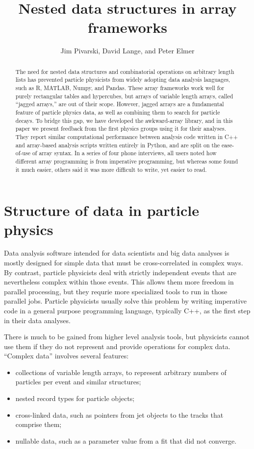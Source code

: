 \documentclass[a4paper]{jpconf}
\begin{document}
\title{Nested data structures in array frameworks}

\author{Jim Pivarski, David Lange, and Peter Elmer}

\address{Princeton University}


\begin{abstract}
The need for nested data structures and combinatorial operations on arbitrary length lists has prevented particle physicists from widely adopting data analysis languages, such as R, MATLAB, Numpy, and Pandas. These array frameworks work well for purely rectangular tables and hypercubes, but arrays of variable length arrays, called ``jagged arrays,'' are out of their scope. However, jagged arrays are a fundamental feature of particle physics data, as well as combining them to search for particle decays. To bridge this gap, we have developed the awkward-array library, and in this paper we present feedback from the first physics groups using it for their analyses. They report similar computational performance between analysis code written in C++ and array-based analysis scripts written entirely in Python, and are split on the ease-of-use of array syntax. In a series of four phone interviews, all users noted how different array programming is from imperative programming, but whereas some found it much easier, others said it was more difficult to write, yet easier to read.
\end{abstract}

\section{Structure of data in particle physics}

Data analysis software intended for data scientists and big data analyses is mostly designed for simple data that must be cross-correlated in complex ways. By contrast, particle physicists deal with strictly independent events that are nevertheless complex within those events. This allows them more freedom in parallel processing, but they requrie more specialized tools to run in those parallel jobs. Particle physicists usually solve this problem by writing imperative code in a general purpose programming language, typically C++, as the first step in their data analyses.

There is much to be gained from higher level analysis tools, but physicists cannot use them if they do not represent and provide operations for complex data. ``Complex data'' involves several features:
\begin{itemize}
\item collections of variable length arrays, to represent arbitrary numbers of particles per event and similar structures;
\item nested record types for particle objects;
\item cross-linked data, such as pointers from jet objects to the tracks that comprise them;
\item nullable data, such as a parameter value from a fit that did not converge.
\end{itemize}
\end{document}
